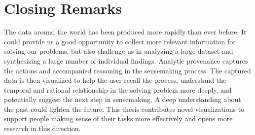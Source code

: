 \section{Closing Remarks}
The data around the world has been produced more rapidly than ever before. It could provide us a good opportunity to collect more relevant information for solving our problems, but also challenge us in analyzing a large dataset and synthesizing a large number of individual findings. Analytic provenance captures the actions and accompanied reasoning in the sensemaking process. The captured data is then visualized to help the user recall the process, understand the temporal and rational relationship in the solving problem more deeply, and potentially suggest the next step in sensemaking. A deep understanding about the past could lighten the future. This thesis contributes novel visualizations to support people making sense of their tasks more effectively and opens more research in this direction.